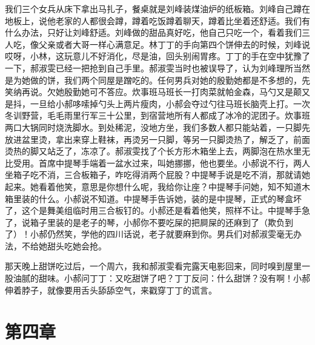 \documentclass[12pt,twoside,openany]{book}
\begin{document}
我们三个女兵从床下拿出马扎子，餐桌就是刘峰装煤油炉的纸板箱。刘峰自己蹲在地板上，说他老家的人都很会蹲，蹲着吃饭蹲着聊天，蹲着比坐着还舒适。我们有什么办法，只好让刘峰舒适。刘峰做的甜品真好吃，他自己只吃一个，看着我们三人吃，像父亲或者大哥一样心满意足。林丁丁的手向第四个饼伸去的时候，刘峰说哎呀，小林，这玩意儿不好消化，尽是油，回头别闹胃疼。丁丁的手在空中犹豫了一下，郝淑雯已经一把抢到自己手里。郝淑雯当时也被误导了，认为刘峰理所当然是为她做的饼，我们两个同屋是蹭吃的。任何男兵对她的殷勤她都是不多想的，先笑纳再说。欠她殷勤她可不答应。炊事班马班长一打肉菜就帕金森，马勺又是颠又是抖，一旦给小郝哆嗦掉勺头上两片瘦肉，小郝会夺过勺往马班长脑壳上打。一次冬训野营，毛毛雨里行军三十公里，到宿营地所有人都成了冰冷的泥团子。炊事班两口大锅同时烧洗脚水。到处稀泥，没地方坐，我们多数人都只能站着，一只脚先放进盆里烫，拿出来穿上鞋袜，再烫另一只脚，等另一只脚烫热了，解乏了，前面烫热的脚又站乏了，冻凉了。郝淑雯找了个长方形木箱坐上去，两脚泡在热水里无比受用。首席中提琴手端着一盆水过来，叫她挪挪，他也要坐。小郝说不行，两人坐箱子吃不消，三合板箱子，咋吃得消两个屁股？中提琴手说是吃不消，那就请她起来。她看着他笑，意思是你想什么呢，我给你让座？中提琴手问她，知不知道木箱里装的什么。小郝说不知道。中提琴手告诉她，装的是中提琴，正式的琴盒坏了，这个是舞美组临时用三合板钉的。小郝还是看着他笑，照样不让。中提琴手急了，说箱子里装的是老子的琴，小郝你不要吃屎的把屙屎的还麻到了（欺负到了）！小郝仍然笑，学他的四川话说，老子就要麻到你。男兵们对郝淑雯毫无办法，不给她甜头吃她会抢。

那天晚上甜饼吃过后，一个周六，我和郝淑雯看完露天电影回来，同时嗅到屋里一股油腻的甜味。小郝问丁丁：又吃甜饼了吧？丁丁反问：什么甜饼？没有啊！小郝伸着脖子，就像要用舌头舔舔空气，来戳穿丁丁的谎言。

\chapter{第四章}
\end{document}
